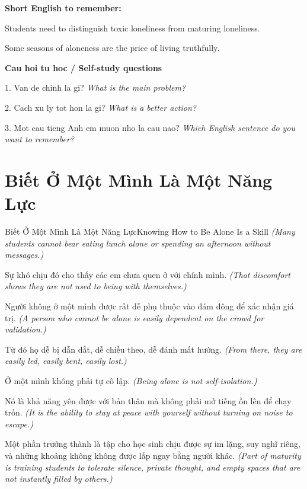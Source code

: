 \begin{ghinhoanh}
\textbf{Short English to remember:}

Students need to distinguish toxic loneliness from maturing loneliness.

Some seasons of aloneness are the price of living truthfully.

\end{ghinhoanh}

\begin{tuhocnhanh}
\textbf{Cau hoi tu hoc / Self-study questions}

1. Van de chinh la gi? \textit{What is the main problem?}

2. Cach xu ly tot hon la gi? \textit{What is a better action?}

3. Mot cau tieng Anh em muon nho la cau nao? \textit{Which English sentence do you want to remember?}
\end{tuhocnhanh}
\ngancach

\section{Biết Ở Một Mình Là Một Năng Lực}
\begin{truyen}{Biết Ở Một Mình Là Một Năng Lực}{Knowing How to Be Alone Is a Skill}
\textit{(Many students cannot bear eating lunch alone or spending an afternoon without messages.)}

Sự khó chịu đó cho thấy các em chưa quen ở với chính mình.
\textit{(That discomfort shows they are not used to being with themselves.)}

Người không ở một mình được rất dễ phụ thuộc vào đám đông để xác nhận giá trị.
\textit{(A person who cannot be alone is easily dependent on the crowd for validation.)}

Từ đó họ dễ bị dẫn dắt, dễ chiều theo, dễ đánh mất hướng.
\textit{(From there, they are easily led, easily bent, easily lost.)}

Ở một mình không phải tự cô lập.
\textit{(Being alone is not self-isolation.)}

Nó là khả năng yên được với bản thân mà không phải mở tiếng ồn lên để chạy trốn.
\textit{(It is the ability to stay at peace with yourself without turning on noise to escape.)}

\end{truyen}

\begin{baihoc}
Một phần trưởng thành là tập cho học sinh chịu được sự im lặng, suy nghĩ riêng, và những khoảng không không được lấp ngay bằng người khác.
\textit{(Part of maturity is training students to tolerate silence, private thought, and empty spaces that are not instantly filled by others.)}
\end{baihoc}

